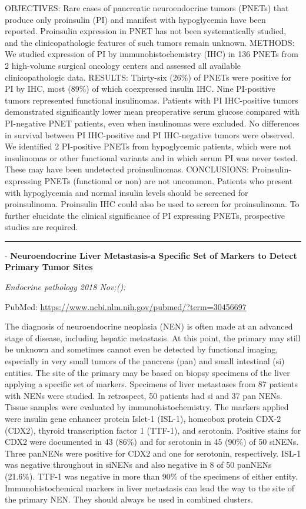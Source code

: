 \documentclass[]{article}
\begin{document}
OBJECTIVES: Rare cases of pancreatic neuroendocrine tumors (PNETs) that
produce only proinsulin (PI) and manifest with hypoglycemia have been
reported. Proinsulin expression in PNET has not been systematically
studied, and the clinicopathologic features of such tumors remain
unknown. METHODS: We studied expression of PI by immunohistochemistry
(IHC) in 136 PNETs from 2 high-volume surgical oncology centers and
assessed all available clinicopathologic data. RESULTS: Thirty-six
(26\%) of PNETs were positive for PI by IHC, most (89\%) of which
coexpressed insulin IHC. Nine PI-positive tumors represented functional
insulinomas. Patients with PI IHC-positive tumors demonstrated
significantly lower mean preoperative serum glucose compared with
PI-negative PNET patients, even when insulinomas were excluded. No
differences in survival between PI IHC-positive and PI IHC-negative
tumors were observed. We identified 2 PI-positive PNETs from
hypoglycemic patients, which were not insulinomas or other functional
variants and in which serum PI was never tested. These may have been
undetected proinsulinomas. CONCLUSIONS: Proinsulin-expressing PNETs
(functional or non) are not uncommon. Patients who present with
hypoglycemia and normal insulin levels should be screened for
proinsulinoma. Proinsulin IHC could also be used to screen for
proinsulinoma. To further elucidate the clinical significance of PI
expressing PNETs, prospective studies are required.

{}

{}

\begin{center}\rule{0.5\linewidth}{\linethickness}\end{center}

 - \textbf{Neuroendocrine Liver Metastasis-a Specific Set of Markers to
Detect Primary Tumor Sites}

\emph{Endocrine pathology 2018 Nov;():}

PubMed: \url{https://www.ncbi.nlm.nih.gov/pubmed/?term=30456697}

The diagnosis of neuroendocrine neoplasia (NEN) is often made at an
advanced stage of disease, including hepatic metastasis. At this point,
the primary may still be unknown and sometimes cannot even be detected
by functional imaging, especially in very small tumors of the pancreas
(pan) and small intestinal (si) entities. The site of the primary may be
based on biopsy specimens of the liver applying a specific set of
markers. Specimens of liver metastases from 87 patients with NENs were
studied. In retrospect, 50 patients had si and 37 pan NENs. Tissue
samples were evaluated by immunohistochemistry. The markers applied were
insulin gene enhancer protein Islet-1 (ISL-1), homeobox protein CDX-2
(CDX2), thyroid transcription factor 1 (TTF-1), and serotonin. Positive
stains for CDX2 were documented in 43 (86\%) and for serotonin in 45
(90\%) of 50 siNENs. Three panNENs were positive for CDX2 and one for
serotonin, respectively. ISL-1 was negative throughout in siNENs and
also negative in 8 of 50 panNENs (21.6\%). TTF-1 was negative in more
than 90\% of the specimens of either entity. Immunohistochemical markers
in liver metastasis can lead the way to the site of the primary NEN.
They should always be used in combined clusters.
\end{document}
